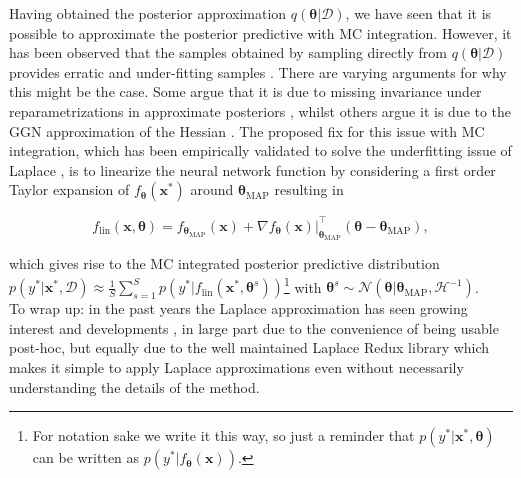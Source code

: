 \noindent Having obtained the posterior approximation $q(\bm{\theta}|\mathcal{D})$, we have seen that it is possible to approximate the posterior predictive with MC integration. However, it has been observed that the samples obtained by sampling directly from $q(\bm{\theta}|\mathcal{D})$ provides erratic and under-fitting samples \citep{2001_lawrencevariational}. There are varying arguments for why this might be the case. Some argue that it is due to missing invariance under reparametrizations in approximate posteriors \citep{2024_BNNReparam}, whilst others argue it is due to the GGN approximation of the Hessian \citep{2021_LocalLinBNNs}. The proposed fix for this issue with MC integration, which has been empirically validated to solve the underfitting issue of Laplace \citep{2019_InBetweenUncertainty}, is to linearize the neural network function by considering a first order Taylor expansion of $f_{\bm{\theta}}(\mathbf{x}^*)$ around $\bm{\theta}_{\text{MAP}}$ \citep{1992_MacKayLinearization} resulting in 

\begin{equation}
    f_{\text{lin}}(\mathbf{x}, \bm{\theta})=f_{\bm{\theta}_{\text{MAP}}}(\mathbf{x})+\nabla f_{\bm{\theta}}(\mathbf{x})|^\top_{\bm{\theta}_{\text{MAP}}}(\bm{\theta}-\bm{\theta}_{\text{MAP}}),
\end{equation}

\noindent which gives rise to the MC integrated posterior predictive distribution
$p(y^*|\mathbf{x}^*, \mathcal{D})\approx\frac{1}{S}\sum^S_{s=1}p(y^*|f_{\text{lin}}(\mathbf{x}^*, \bm{\theta}^s))$\footnote{For notation sake we write it this way, so just a reminder that $p(y^*|\mathbf{x}^*, \bm{\theta})$ can be written as $p(y^*|f_{\bm{\theta}}(\mathbf{x}))$.} with $\bm{\theta}^s\sim\mathcal{N}(\bm{\theta}|\bm{\theta}_{\text{MAP}}, \mathcal{H}^{-1})$.\\

\noindent To wrap up: in the past years the Laplace approximation has seen growing interest and developments \citep{2022_LaplacianAutoEncoders,2024_functionalpriorslaplace, 2024_RiemanninaLaplace, 2024_LLMMaterials}, in large part due to the convenience of being usable post-hoc, but equally due to the well maintained Laplace Redux \citep{2021_LaplaceRedux} library which makes it simple to apply Laplace approximations even without necessarily understanding the details of the method.

